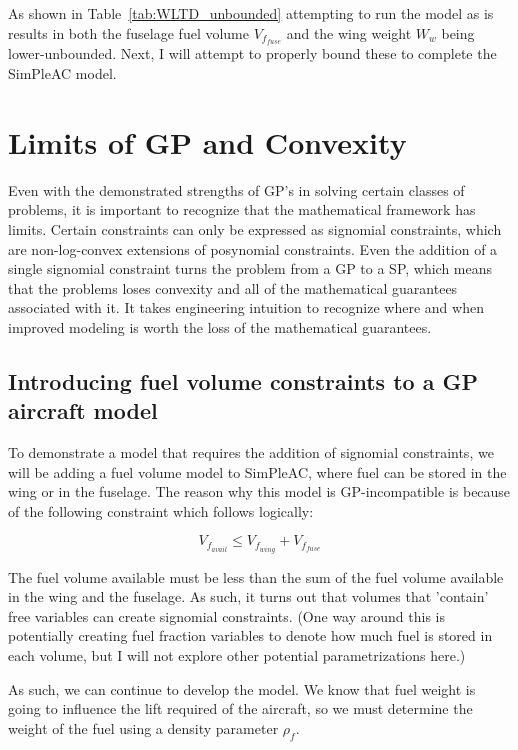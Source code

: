 As shown in Table~\ref{tab:WLTD_unbounded} attempting to run the model as is
results in both the fuselage fuel
volume $V_{f_{fuse}}$ and the wing weight $W_w$ being lower-unbounded. Next,
I will attempt to properly bound these to complete the SimPleAC model.

\section{Limits of GP and Convexity} \label{s:GPLimits}

Even with the demonstrated strengths of \gls{GP}'s in solving certain classes of 
problems, it is important to recognize that the mathematical framework has limits. 
Certain constraints can only be expressed as signomial constraints, which are 
non-log-convex extensions of posynomial constraints. Even the addition of a single 
signomial constraint turns the problem from a \gls{GP} to a \gls{SP}, which means
that the problems loses convexity and all of the mathematical guarantees associated with it. 
It takes engineering intuition to recognize where and when improved modeling is worth
the loss of the mathematical guarantees.

\subsection{Introducing fuel volume constraints to a GP aircraft model}

To demonstrate a model that requires the addition of signomial constraints, we will 
be adding a fuel volume model to SimPleAC, where fuel can be stored in the wing or
in the fuselage. The reason why this model is GP-incompatible is because of the 
following constraint which follows logically:

\begin{equation}
	V_{f_{avail}} \leq V_{f_{wing}} + V_{f_{fuse}}
	\label{vfavail}
\end{equation}

The fuel volume available must be less than the sum of the fuel volume available in the
wing and the fuselage. As such, it turns out that volumes that 'contain' free variables
can create signomial constraints. (One way around this is potentially creating fuel
fraction variables to denote how much fuel is stored in each volume, but I will not 
explore other potential parametrizations here.)

As such, we can continue to develop the model. We know that fuel weight is going 
to influence the lift required of the aircraft, so we must determine the weight of the fuel 
using a density parameter $\rho_{f}$. 

